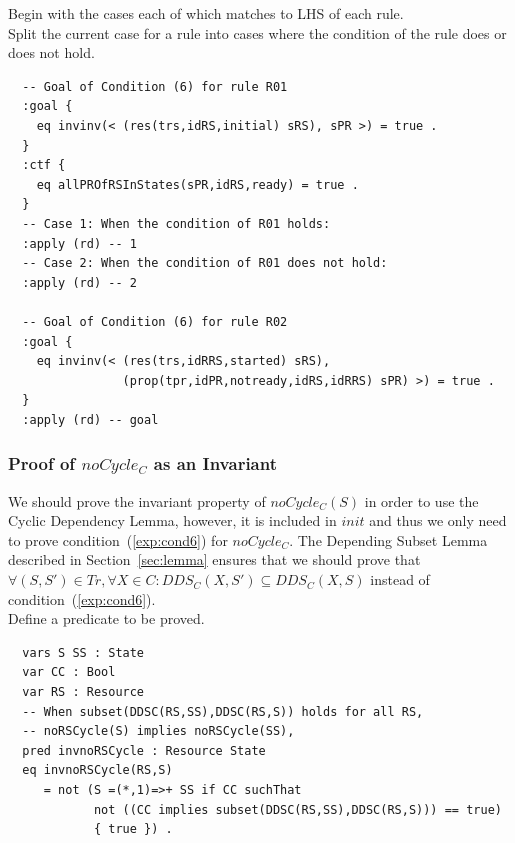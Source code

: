 \documentclass[12pt]{report}
\begin{document}
 Begin with the cases each of which matches to
LHS of each rule. \\ 
 Split the current case for a rule into
cases where the condition of the rule does or does not hold. 
\small
\begin{verbatim}
  -- Goal of Condition (6) for rule R01
  :goal {
    eq invinv(< (res(trs,idRS,initial) sRS), sPR >) = true .
  }
  :ctf {
    eq allPROfRSInStates(sPR,idRS,ready) = true .
  }
  -- Case 1: When the condition of R01 holds:
  :apply (rd) -- 1
  -- Case 2: When the condition of R01 does not hold:
  :apply (rd) -- 2

  -- Goal of Condition (6) for rule R02
  :goal {
    eq invinv(< (res(trs,idRRS,started) sRS),
                (prop(tpr,idPR,notready,idRS,idRRS) sPR) >) = true .
  }
  :apply (rd) -- goal
\end{verbatim}
\normalsize

\subsubsection*{Proof of $noCycle_C$ as an Invariant}
We should prove the invariant property of $noCycle_C(S)$ in order to
use the Cyclic Dependency Lemma, however, it is included in $init$ and
thus we only need to prove condition~(\ref{exp:cond6}) for $noCycle_C$.
The Depending Subset Lemma described in Section~\ref{sec:lemma}
ensures that we should prove that $\forall (S,S') \in T\!r, \forall X\in
C:DDS\!_C(X,S')\subseteq DDS\!_C(X,S)$ instead of
condition~(\ref{exp:cond6}).\\

 Define a predicate to be proved. 
\small
\begin{verbatim}
  vars S SS : State
  var CC : Bool
  var RS : Resource
  -- When subset(DDSC(RS,SS),DDSC(RS,S)) holds for all RS,
  -- noRSCycle(S) implies noRSCycle(SS),
  pred invnoRSCycle : Resource State
  eq invnoRSCycle(RS,S) 
     = not (S =(*,1)=>+ SS if CC suchThat
            not ((CC implies subset(DDSC(RS,SS),DDSC(RS,S))) == true)
            { true }) .
\end{verbatim}
\normalsize
\end{document}
